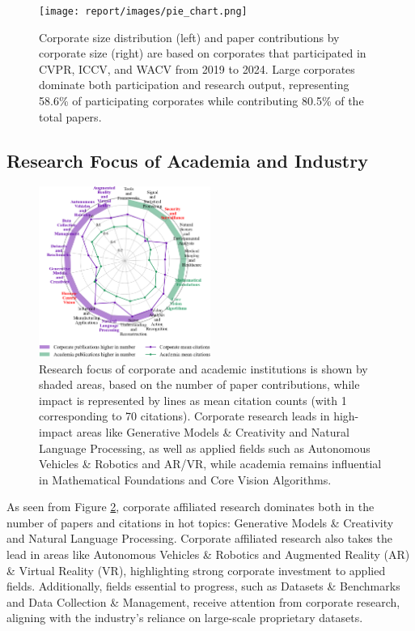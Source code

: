 \documentclass{article}
\begin{document}
\begin{figure}[ht]
  \centering
  \texttt{[image: report/images/pie\_chart.png]}  
  \caption{Corporate size distribution (left) and paper contributions by corporate size (right) are based on corporates that participated in CVPR, ICCV, and WACV from 2019 to 2024. Large corporates dominate both participation and research output, representing 58.6\% of participating corporates while contributing 80.5\% of the total papers.}
  \label{fig:corporate_size_graph}
\end{figure}
\vspace{-10pt}
\newpage
\subsection{Research Focus of Academia and Industry}
\vspace{-7pt}

\begin{figure}
\centering
\vspace{-10pt}
\includegraphics[width=0.5\textwidth]{report/images/citation_radar_plot.png}  
\caption{Research focus of corporate and academic institutions is shown by shaded areas, based on the number of paper contributions, while impact is represented by lines as mean citation counts (with 1 corresponding to 70 citations). Corporate research leads in high-impact areas like Generative Models & Creativity and Natural Language Processing, as well as applied fields such as Autonomous Vehicles & Robotics and AR/VR, while academia remains influential in Mathematical Foundations and Core Vision Algorithms.}
\vspace{10pt}
\label{fig:research_focus_radar}
\end{figure}
As seen from Figure \ref{fig:research_focus_radar}, corporate affiliated research dominates both in the number of papers and citations in hot topics: Generative Models \& Creativity and Natural Language Processing. Corporate affiliated research also takes the lead in areas like Autonomous Vehicles \& Robotics and Augmented Reality (AR) \& Virtual Reality (VR), highlighting strong corporate investment to applied fields. Additionally, fields essential to progress, such as Datasets \& Benchmarks and Data Collection \& Management, receive attention from corporate research, aligning with the industry's reliance on large-scale proprietary datasets.
\end{document}
